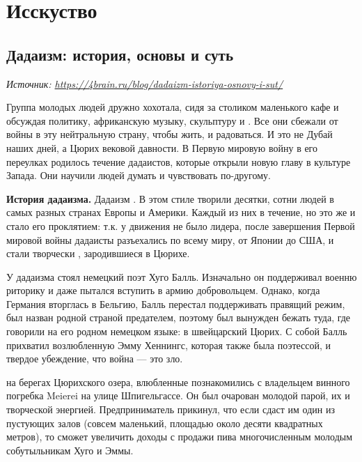 \chapter{Исскуство}

\section{Дадаизм: история, основы и суть}

\textit{Источник: \url{https://4brain.ru/blog/dadaizm-istoriya-osnovy-i-sut/}}

Группа молодых людей дружно хохотала, сидя за столиком маленького кафе и обсуждая политику, африканскую музыку, скульптуру и . Все они сбежали от войны в эту нейтральную страну, чтобы жить,  и радоваться. И это не Дубай наших дней, а Цюрих вековой давности. В Первую мировую войну в его переулках родилось течение дадаистов, которые открыли новую главу в культуре Запада. Они научили людей думать и чувствовать по-другому.

\textbf{История дадаизма.}
Дадаизм . В этом стиле творили десятки, сотни людей в самых разных странах Европы и Америки. Каждый из них  в течение, но это же и стало его проклятием: т.к. у движения не было лидера, после завершения Первой мировой войны дадаисты разъехались по всему миру, от Японии до США, и стали творчески , зародившиеся в Цюрихе.

У  дадаизма стоял немецкий поэт Хуго Балль. Изначально он поддерживал военню риторику и даже пытался вступить в армию добровольцем. Однако, когда Германия вторглась в Бельгию, Балль перестал поддерживать правящий режим, был назван родной страной предателем, поэтому был вынужден бежать туда, где говорили на его родном немецком языке: в швейцарский Цюрих. С собой Балль прихватил возлюбленную Эмму Хеннингс, которая также была поэтессой, и твердое убеждение, что война --- это зло.

 на берегах Цюрихского озера, влюбленные познакомились с владельцем винного погребка Meierei на улице Шпигельгассе. Он был очарован молодой парой, их  и творческой энергией. Предприниматель прикинул, что если сдаст им один из пустующих залов (совсем маленький, площадью около десяти квадратных метров), то сможет увеличить доходы с продажи пива многочисленным молодым собутыльникам Хуго и Эммы.

